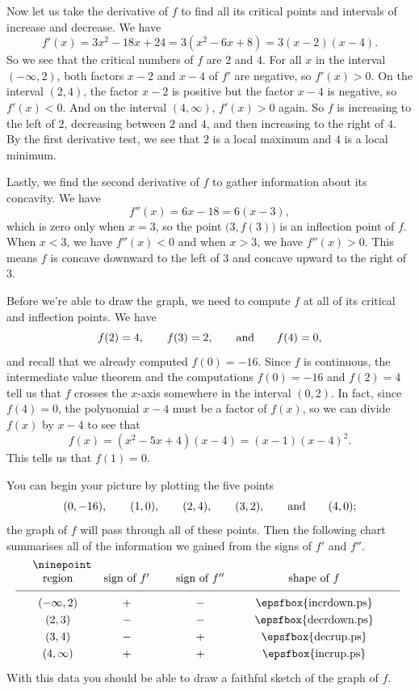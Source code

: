 Now let us take the derivative of $f$ to find all its critical points and intervals of increase and decrease.
We have
$$f'(x) = 3x^2 - 18x + 24 = 3(x^2-6x+8) = 3(x-2)(x-4).$$
So we see that the critical numbers of $f$ are $2$ and $4$. For all $x$ in the interval $(-\infty, 2)$,
both factors $x-2$ and $x-4$ of $f'$ are negative, so $f'(x) > 0$. On the interval $(2,4)$, the factor
$x-2$ is positive but the factor $x-4$ is negative, so $f'(x) <0$. And on the interval $(4,\infty)$,
$f'(x) > 0$ again. So $f$ is increasing to the left of $2$, decreasing between $2$ and $4$, and then
increasing to the right of $4$. By the first derivative test, we see that $2$ is a local maximum and
$4$ is a local minimum.

Lastly, we find the second derivative of $f$ to gather information about its concavity. We have
$$f''(x) = 6x-18 = 6(x-3),$$
which is zero only when $x=3$, so the point $\bigl(3, f(3)\bigr)$ is an inflection point of $f$.
When $x<3$, we have $f''(x) < 0$ and when $x>3$, we have $f''(x) > 0$. This means $f$ is concave
downward to the left of $3$ and concave upward to the right of $3$.

Before we're able to draw the graph, we need to compute $f$ at all of its critical and inflection points.
We have
$$f(2) = 4,\qquad f(3) = 2,\qquad\hbox{and}\qquad f(4) = 0,$$
and recall that we already computed $f(0) = -16$. Since $f$ is continuous, the intermediate value
theorem and the computations $f(0) = -16$ and $f(2) = 4$ tell us that $f$ crosses the $x$-axis somewhere
in the interval $(0,2)$. In fact, since $f(4) =0$, the polynomial
$x-4$ must be a factor of $f(x)$, so we can divide $f(x)$ by $x-4$ to see that
$$f(x) = (x^2-5x+4)(x-4) = (x-1)(x-4)^2.$$
This tells us that $f(1) = 0$.

You can begin your picture by plotting the five points
$$(0,-16),\qquad (1,0), \qquad (2,4), \qquad (3,2),\qquad\hbox{and}\qquad (4,0);$$
the graph of $f$ will pass through all of these points. Then the following chart summarises all of
the information we gained from the signs of $f'$ and $f''$.
$$
\vbox{\ninepoint
\tabskip=2em plus.2em minus .2em
\halign{
\hfil $#$ \hfil & \hfil#\hfil & \hfil # \hfil  & \hfil#\hfil\cr
\hbox{region} & sign of $f'$  & sign of $f''$ & shape of $f$ \cr
\noalign{\medskip}
\noalign{\hrule}
\noalign{\medskip}
(-\infty, 2) & $+$ & $-$ & \epsfbox{incrdown.ps} \cr
\noalign{\smallskip}
(2,3)        & $-$ & $-$ & \epsfbox{decrdown.ps} \cr
\noalign{\smallskip}
(3,4)        & $-$ & $+$ & \epsfbox{decrup.ps} \cr
\noalign{\smallskip}
(4,\infty)   & $+$ & $+$ & \epsfbox{incrup.ps} \cr
}}
$$
With this data you should be able to draw a faithful sketch of the graph of $f$.

